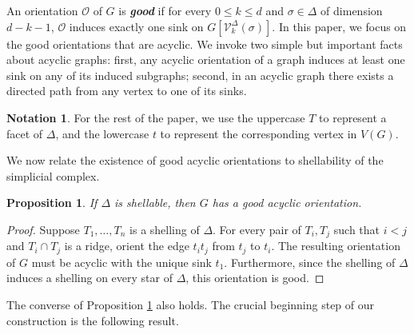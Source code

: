 \documentclass[11pt,twoside]{article}
\newtheorem{proposition}[theorem]{Proposition}
\theoremstyle{definition}
\newtheorem*{notation*}{Notation}
\newcommand{\cO}{\mathcal{O}}
\newcommand{\cV}{\mathcal{V}}
\begin{document}
An orientation $\cO$ of $G$ is \textbf{\emph{good}} if for every $0 \le k \le d$ and $\sigma \in \Delta$ of dimension $d-k-1$, $\cO$ induces exactly one sink on $G[\cV^\Delta_k(\sigma)]$. In this paper, we focus on the good orientations that are acyclic. We invoke two simple but important facts about acyclic graphs: first, any acyclic orientation of a graph induces at least one sink on any of its induced subgraphs; second, in an acyclic graph there exists a directed path from any vertex to one of its sinks. 

\begin{notation*}
    For the rest of the paper, we use the uppercase $T$ to represent a facet of $\Delta$, and the lowercase $t$ to represent the corresponding vertex in $V(G)$. 
\end{notation*}

We now relate the existence of good acyclic orientations to shellability of the simplicial complex. 
\begin{proposition}\label{prop:orientationexists}
If $\Delta$ is shellable, then $G$ has a good acyclic orientation. 
\end{proposition}
\begin{proof}
    Suppose $T_1, \dots, T_n$ is a shelling of $\Delta$. For every pair of $T_i, T_j$ such that $i < j$ and $T_i \cap T_j$ is a ridge, orient the edge $t_it_j$ from $t_j$ to $t_i$. The resulting orientation of $G$ must be acyclic with the unique sink $t_1$. Furthermore, since the shelling of $\Delta$ induces a shelling on every star of $\Delta$, this orientation is good. 
\end{proof}

The converse of Proposition \ref{prop:orientationexists} also holds. The crucial beginning step of our construction is the following result. 
\end{document}
